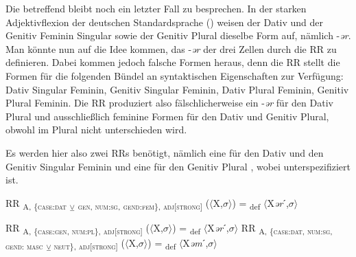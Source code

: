 \begin{exe}
\begin{exe}
Die  betreffend bleibt noch ein letzter Fall zu besprechen. In der starken Adjektivflexion der deutschen Standardsprache () weisen der Dativ und der Genitiv Feminin Singular sowie der Genitiv Plural dieselbe Form auf, nämlich -\textit{ər}. Man könnte nun auf die Idee kommen, das  -\textit{ər} der drei Zellen durch die RR  zu definieren. Dabei kommen jedoch falsche Formen heraus, denn die RR  stellt die Formen für die folgenden Bündel an syntaktischen Eigenschaften zur Verfügung: Dativ Singular Feminin, Genitiv Singular Feminin, Dativ Plural Feminin, Genitiv Plural Feminin. Die RR  produziert also fälschlicherweise ein -\textit{ər} für den Dativ Plural und ausschließlich feminine Formen für den Dativ und Genitiv Plural, obwohl im Plural  nicht unterschieden wird.

\z

\noindent
Es werden hier also zwei RRs benötigt, nämlich eine für den Dativ und den Genitiv Singular Feminin  und eine für den Genitiv Plural , wobei  unterspezifiziert ist.

\ea%
    \label{ex:key:37}
RR \textsubscript{A, \{\textsc{case:dat}} \textsubscript{${\veebar}$}\textsubscript{ \textsc{gen}, \textsc{num:sg}}\textsubscript{,} \textsubscript{\textsc{gend:fem}\}, \textsc{adj[strong]}} ($\langle$X,$\sigma$$\rangle$) = \textsubscript{def} $\langle$X\textit{ər}ˊ,$\sigma$$\rangle$
\z

\ea%
    \label{ex:key:38}
 RR \textsubscript{A, \{\textsc{case:gen}, \textsc{num:pl}\}, \textsc{adj[strong]}} ($\langle$X,$\sigma$$\rangle$) = \textsubscript{def} $\langle$X\textit{ər}ˊ,$\sigma$$\rangle$
\z
\ea%
    \label{ex:key:39}
RR \textsubscript{A, \{\textsc{case:dat}, \textsc{num:sg}, \textsc{gend}: \textsc{masc}} \textsubscript{${\veebar}$ \textsc{neut}}\textsubscript{\}, \textsc{adj[strong]}} ($\langle$X,$\sigma$$\rangle$) = \textsubscript{def} $\langle$X\textit{əm}ˊ,$\sigma$$\rangle$
\z


\end{exe}
\end{exe}
